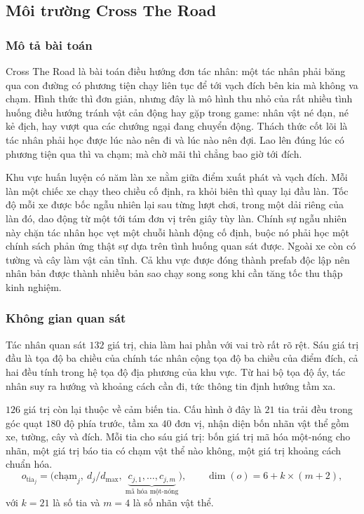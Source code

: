 \subsection{Môi trường Cross The Road}
\label{sub:env-crossroad}

\subsubsection{Mô tả bài toán}
\indent Cross The Road là bài toán điều hướng đơn tác nhân: một tác nhân phải băng qua con
đường có phương tiện chạy liên tục để tới vạch đích bên kia mà không va chạm. Hình thức thì
đơn giản, nhưng đây là mô hình thu nhỏ của rất nhiều tình huống điều hướng tránh vật cản
động hay gặp trong game: nhân vật né đạn, né kẻ địch, hay vượt qua các chướng ngại đang
chuyển động. Thách thức cốt lõi là tác nhân phải học được lúc nào nên đi và lúc nào nên
đợi. Lao lên đúng lúc có phương tiện qua thì va chạm; mà chờ mãi thì chẳng bao giờ tới
đích.

\indent Khu vực huấn luyện có năm làn xe nằm giữa điểm xuất phát và vạch đích. Mỗi làn một
chiếc xe chạy theo chiều cố định, ra khỏi biên thì quay lại đầu làn. Tốc độ mỗi xe được bốc
ngẫu nhiên lại sau từng lượt chơi, trong một dải riêng của làn đó, dao động từ một tới tám
đơn vị trên giây tùy làn. Chính sự ngẫu nhiên này chặn tác nhân học vẹt một chuỗi hành
động cố định, buộc nó phải học một chính sách phản ứng thật sự dựa trên tình huống quan
sát được. Ngoài xe còn có tường và cây làm vật cản tĩnh. Cả khu vực được đóng thành prefab
độc lập nên nhân bản được thành nhiều bản sao chạy song song khi cần tăng tốc thu thập
kinh nghiệm.

\subsubsection{Không gian quan sát}
\label{sub:cross-obs}
\indent Tác nhân quan sát $132$ giá trị, chia làm hai phần với vai trò rất
rõ rệt. Sáu giá trị đầu là tọa độ ba chiều của chính tác nhân cộng tọa độ ba chiều của
điểm đích, cả hai đều tính trong hệ tọa độ địa phương của khu vực. Từ hai bộ tọa độ ấy,
tác nhân suy ra hướng và khoảng cách cần đi, tức thông tin định hướng tầm xa.

\indent $126$ giá trị còn lại thuộc về cảm biến tia. Cấu hình ở đây là $21$ tia trải đều trong
góc quạt $180$ độ phía trước, tầm xa $40$ đơn vị, nhận diện bốn nhãn vật thể gồm xe, tường, cây
và đích. Mỗi tia cho sáu giá trị: bốn
giá trị mã hóa một-nóng cho nhãn, một giá trị báo tia có chạm vật thể nào không, một giá
trị khoảng cách chuẩn hóa.
\begin{equation}
o_{\text{tia}_j} = \bigl(\text{chạm}_j,\ d_j / d_{\max},\
\underbrace{c_{j,1}, \dots, c_{j,m}}_{\text{mã hóa một-nóng}}\bigr),
\qquad
\dim(o) = 6 + k \times (m + 2),
\end{equation}
với $k = 21$ là số tia và $m = 4$ là số nhãn vật thể.

